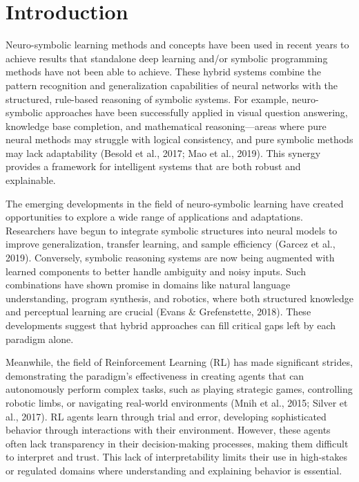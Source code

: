 \chapter{Introduction} \label{ch:introduction}

Neuro-symbolic learning methods and concepts have been used in recent years to achieve results that standalone deep learning and/or symbolic programming methods have not been able to achieve. These hybrid systems combine the pattern recognition and generalization capabilities of neural networks with the structured, rule-based reasoning of symbolic systems. For example, neuro-symbolic approaches have been successfully applied in visual question answering, knowledge base completion, and mathematical reasoning—areas where pure neural methods may struggle with logical consistency, and pure symbolic methods may lack adaptability (Besold et al., 2017; Mao et al., 2019). This synergy provides a framework for intelligent systems that are both robust and explainable.

The emerging developments in the field of neuro-symbolic learning have created opportunities to explore a wide range of applications and adaptations. Researchers have begun to integrate symbolic structures into neural models to improve generalization, transfer learning, and sample efficiency (Garcez et al., 2019). Conversely, symbolic reasoning systems are now being augmented with learned components to better handle ambiguity and noisy inputs. Such combinations have shown promise in domains like natural language understanding, program synthesis, and robotics, where both structured knowledge and perceptual learning are crucial (Evans \& Grefenstette, 2018). These developments suggest that hybrid approaches can fill critical gaps left by each paradigm alone.

Meanwhile, the field of Reinforcement Learning (RL) has made significant strides, demonstrating the paradigm’s effectiveness in creating agents that can autonomously perform complex tasks, such as playing strategic games, controlling robotic limbs, or navigating real-world environments (Mnih et al., 2015; Silver et al., 2017). RL agents learn through trial and error, developing sophisticated behavior through interactions with their environment. However, these agents often lack transparency in their decision-making processes, making them difficult to interpret and trust. This lack of interpretability limits their use in high-stakes or regulated domains where understanding and explaining behavior is essential.

